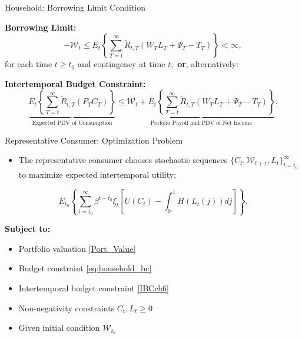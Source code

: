 \documentclass[11pt,aspectratio=169]{beamer}
\begin{document}
\begin{frame}{Household: Borrowing Limit Condition}
\small

\vspace{0.3cm}
\noindent\textbf{Borrowing Limit:}
\begin{equation*}
-\mathcal{W}_{t}\leq E_{t}\left\{ \sum_{T=t}^{\infty }\tilde{R}%
_{t,T}(W_{T}L_{T}+\Psi _{T}-T_{T})\right\} <\infty ,
\end{equation*}%
\hspace{0.65cm}
\vspace{0.45cm}
for each time $t\geq t_{0}$ and contingency at time $t;$ \textbf{or}, alternatively:     

\vspace{0.3cm}
\textbf{Intertemporal Budget Constraint:}
\begin{equation}
\underbrace{E_{t}\left\{ \sum_{T=t}^{\infty }\tilde{R}_{t,T}(P_{T}C_{T})\right\}}_\text{Expected PDV of Consumption} \leq 
\underbrace{\mathcal{W}_{t}+E_{t}\left\{ \sum_{T=t}^{\infty }\tilde{R}%
_{t,T}(W_{T}L_{T}+\Psi _{T}-T_{T})\right\}}_\text{Porfolio Payoff and PDV of Net Income}.  \label{IBCch6}
\end{equation}%
\end{frame}
\begin{frame}{Representative Consumer: Optimization Problem}
\small
\begin{itemize}
    \item The representative consumer chooses stochastic sequences 
$\{C_t, \mathcal{W}_{t+1}, L_t\}_{t=t_0}^\infty$ 
to maximize expected intertemporal utility:
\end{itemize}
\[
E_{t_{0}}\left\{ \sum_{t=t_{0}}^{\infty }\beta ^{t-t_{0}}\xi _{t}\left[
U(C_{t})-\int_{0}^{1}H(L_{t}(j))dj\right] \right\}.
\]

\textbf{Subject to:}
\begin{itemize}
  \item Portfolio valuation \eqref{Port_Value}
  \item Budget constraint \eqref{eq:household_bc}
  \item Intertemporal budget constraint \eqref{IBCch6}
  \item Non-negativity constraints $C_t, L_t \ge 0$
  \item Given initial condition 
  $\mathcal{W}_{t_0}$
\end{itemize}
\end{frame}
\end{document}
